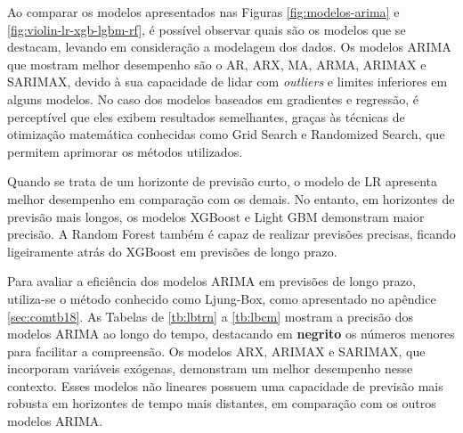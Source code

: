 Ao comparar os modelos apresentados nas Figuras \ref{fig:modelos-arima} e \ref{fig:violin-lr-xgb-lgbm-rf}, é possível observar quais são os modelos que se destacam, levando em consideração a modelagem dos dados. Os modelos ARIMA que mostram melhor desempenho são o AR, ARX, MA, ARMA, ARIMAX e SARIMAX, devido à sua capacidade de lidar com \textit{outliers} e limites inferiores em alguns modelos. No caso dos modelos baseados em gradientes e regressão, é perceptível que eles exibem resultados semelhantes, graças às técnicas de otimização matemática conhecidas como Grid Search e Randomized Search, que permitem aprimorar os métodos utilizados.

Quando se trata de um horizonte de previsão curto, o modelo de LR apresenta melhor desempenho em comparação com os demais. No entanto, em horizontes de previsão mais longos, os modelos XGBoost e Light GBM demonstram maior precisão. A Random Forest também é capaz de realizar previsões precisas, ficando ligeiramente atrás do XGBoost em previsões de longo prazo.

Para avaliar a eficiência dos modelos ARIMA em previsões de longo prazo, utiliza-se o método conhecido como Ljung-Box, como apresentado no apêndice \ref{sec:comtb18}. As Tabelas de \ref{tb:lbtrn} a \ref{tb:lbcm} mostram a precisão dos modelos ARIMA ao longo do tempo, destacando em \textbf{negrito} os números menores para facilitar a compreensão. Os modelos ARX, ARIMAX e SARIMAX, que incorporam variáveis exógenas, demonstram um melhor desempenho nesse contexto. Esses modelos não lineares possuem uma capacidade de previsão mais robusta em horizontes de tempo mais distantes, em comparação com os outros modelos ARIMA.

